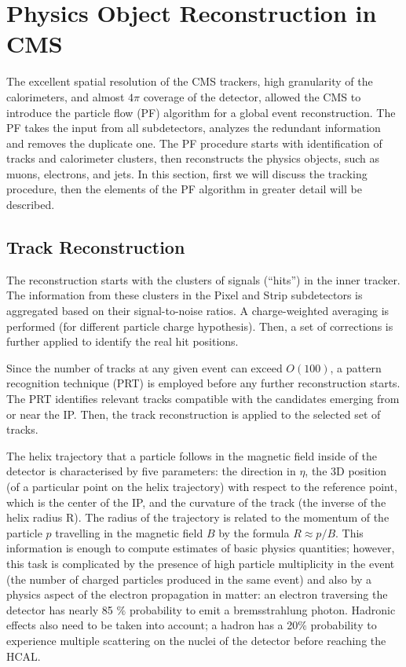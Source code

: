 
\chapter{Physics Object Reconstruction in CMS} \label{sec:cms_reco}

The excellent spatial resolution of the CMS trackers, high granularity of the calorimeters, and almost $4\pi$ coverage of the detector, allowed the CMS to introduce the particle flow (PF) algorithm \cite{Particle_flow} for a global event reconstruction. The PF takes the input from all subdetectors, analyzes the redundant information and removes the duplicate one. The PF procedure starts with identification of tracks and calorimeter clusters, then reconstructs the physics objects, such as muons, electrons, and jets. In this section, first we will discuss the tracking procedure, then the elements of the PF algorithm in greater detail will be described.
    
\section{Track Reconstruction}\label{sec:track_reconstruction}

The reconstruction starts with the clusters of signals (``hits'') in the inner tracker. The information from these clusters in the Pixel and Strip subdetectors is aggregated based on their signal-to-noise ratios. A charge-weighted averaging is performed (for different particle charge hypothesis). Then, a set of corrections is further applied to identify the real hit positions. 

Since the number of tracks at any given event can exceed $O(100)$, a pattern recognition technique (PRT) is employed before any further reconstruction starts. The PRT identifies relevant tracks compatible with the candidates emerging from or near the IP. Then, the track reconstruction is applied to the selected set of tracks. 


The helix trajectory that a particle follows in the magnetic field inside of the detector is characterised by five parameters: the direction in $\eta$, the 3D position (of a particular point on the helix trajectory) with respect to the reference point, which is the center of the IP, and the curvature of the track (the inverse of the helix radius R). The radius of the trajectory is related to the momentum of the particle $p$ travelling in the magnetic field $B$ by the formula $R \approx p/B$. This information is enough to compute estimates of basic physics quantities; however, this task is complicated by the presence of high particle multiplicity in the event (the number of charged particles produced in the same event) and also by a physics aspect of the electron propagation in matter: an electron traversing the detector has nearly 85 $\%$ probability to emit a bremsstrahlung photon. Hadronic effects also need to be taken into account; a hadron has a 20$\%$ probability to experience multiple scattering on the nuclei of the detector before reaching the HCAL. 



